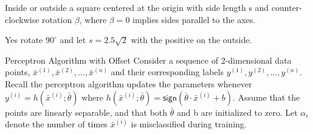 \documentclass[12pt, letterpaper]{article}
\begin{document}
\begin{subproblem}{}
    Inside or outside a square centered at the origin with side length s and counter-clockwise rotation
    $\beta$, where $\beta= 0$  implies sides parallel to the axes.
\end{subproblem}
\begin{solution}
    Yes rotate $90^\circ$ and let $s=2.5\sqrt{2}$ with the positive on the outside.\\
\end{solution}

\begin{problem}{Perceptron Algorithm with Offset}
    Consider a sequence of 2-dimensional data points, $\bar{x}^{(1)}, \bar{x}^{(2)}, \dots, \bar{x}^{(n)}$ and their corresponding labels
    $y^{(1)}, y^{(2)}, . . . , y^{(n)}$. Recall the perceptron algorithm updates the parameters whenever $y^{(i)} = h(\bar{x}^{(i)}; \bar{\theta})$
    where $h(\bar{x}^{(i)}; \bar{\theta}) = \mathsf{sign}(\bar{\theta} \cdot \bar{x}^{(i)} + b)$. Assume that the points are linearly separable, and that both $\bar{\theta}$ and b
    are initialized to zero. Let $\alpha_i$ denote the number of times $\bar{x}^{(i)}$ is misclassified during training.
\end{problem}
\end{document}
